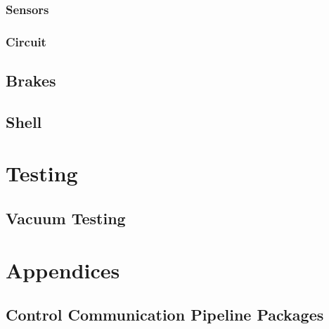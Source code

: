 \documentclass[11pt,a4paper,oldfontcommands]{memoir}
\begin{document}
\subsection{Sensors}

\subsection{Circuit}

\section{Brakes}

\section{Shell}

\chapter{Testing}

\section{Vacuum Testing}

\appendix

\chapter{Appendices}

\section{Control Communication Pipeline Packages}
\label{appendix:comm_messages}
\end{document}
